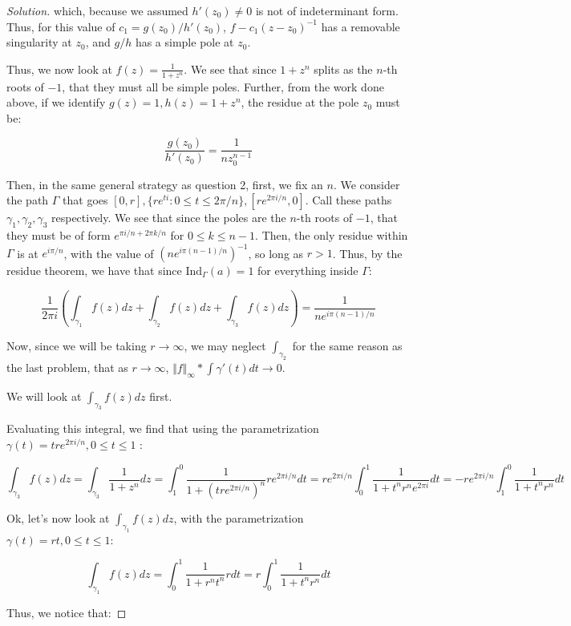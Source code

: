 \documentclass[10pt]{article}
\begin{document}
\begin{proof}[Solution]
which, because we assumed $h'(z_0) \not = 0$ is not of indeterminant form. Thus, for this value of $c_1 = g(z_0)/h'(z_0)$, $f - c_1 (z  - z_0)^{-1}$ has a removable singularity at $z_0$, and $g/h$ has a simple pole at $z_0$.

Thus, we now look at $f(z) = \frac{1}{1 + z^n}$. We see that since $1 + z^n$ splits as the $n$-th roots of $-1$, that they must all be simple poles. Further, from the work done above, if we identify $g(z) = 1, h(z) = 1 + z^n$, the residue at the pole $z_0$ must be:

$$  \frac{g(z_0)}{h'(z_0)} =  \frac{1}{nz_0^{n-1}}$$

Then, in the same general strategy as question 2, first, we fix an $n$. We consider the path $\Gamma$ that goes $[0,r], \{ re^{t i} : 0 \leq t \leq 2\pi/n \},[re^{2\pi i/n}, 0]$. Call these paths $\gamma_1, \gamma_2, \gamma_3$ respectively. We see that since the poles are the $n$-th roots of $-1$, that they must be of form $e^{\pi i/n + 2\pi k /n}$ for $0 \leq k \leq n-1$. Then, the only residue within $\Gamma$ is at $e^{i\pi/n}$, with the value of $(ne^{i\pi (n-1)/n})^{-1}$, so long as $r > 1$. Thus, by the residue theorem, we have that since $\text{Ind}_\Gamma(a) = 1$ for everything inside $\Gamma$:

$$\frac{1}{2\pi i} \left( \int_{\gamma_1} f(z) dz + \int_{\gamma_2} f(z) dz + \int_{\gamma_3} f(z) dz \right) = \frac{1}{ne^{i\pi (n-1)/n}} $$

Now, since we will be taking $r \to \infty$, we may neglect $\int_{\gamma_2}$ for the same reason as the last problem, that as $r \to \infty$, $\Vert f \Vert_\infty * \int \gamma'(t) dt \to 0$.

We will look at $\int_{\gamma_3} f(z) dz$ first.

Evaluating this integral, we find that using the parametrization $\gamma(t) = tre^{2\pi i/n}, 0 \leq t \leq 1$ :

$$ \int_{\gamma_3} f(z) dz = \int_{\gamma_3} \frac{1}{1 + z^n} dz = \int_1^0 \frac{1}{1 + (tre^{2\pi i /n})^n} re^{2\pi i/n} dt = re^{2\pi i/n}  \int_0^1 \frac{1}{1 + t^nr^ne^{2\pi i}}dt =  -re^{2\pi i/n}  \int_1^0 \frac{1}{1 + t^nr^n}dt$$

Ok, let's now look at $\int_{\gamma_1} f(z) dz$, with the parametrization $\gamma(t) = rt, 0 \leq t \leq 1$:

$$ \int_{\gamma_1} f(z) dz = \int_0^1 \frac{1}{1 + r^nt^n} r dt = r \int_0^1 \frac{1}{1 + t^nr^n}dt$$

Thus, we notice that:


\end{proof}
\end{document}
